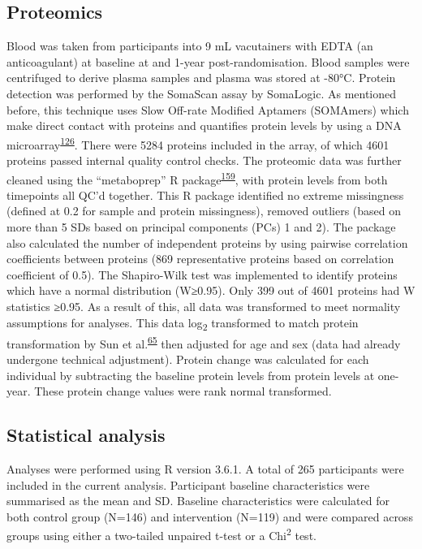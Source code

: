 \documentclass[11pt,twoside]{bristolthesis}
\begin{document}
\hypertarget{proteomics}{%
\subsection{Proteomics}\label{proteomics}}

Blood was taken from participants into 9 mL vacutainers with EDTA (an anticoagulant) at baseline at and 1-year post-randomisation. Blood samples were centrifuged to derive plasma samples and plasma was stored at -80°C. Protein detection was performed by the SomaScan assay by SomaLogic. As mentioned before, this technique uses Slow Off-rate Modified Aptamers (SOMAmers) which make direct contact with proteins and quantifies protein levels by using a DNA microarray\textsuperscript{\protect\hyperlink{ref-Rohloff2014}{126}}. There were 5284 proteins included in the array, of which 4601 proteins passed internal quality control checks. The proteomic data was further cleaned using the ``metaboprep'' R package\textsuperscript{\protect\hyperlink{ref-Hughes2021}{159}}, with protein levels from both timepoints all QC'd together. This R package identified no extreme missingness (defined at 0.2 for sample and protein missingness), removed outliers (based on more than 5 SDs based on principal components (PCs) 1 and 2). The package also calculated the number of independent proteins by using pairwise correlation coefficients between proteins (869 representative proteins based on correlation coefficient of 0.5). The Shapiro-Wilk test was implemented to identify proteins which have a normal distribution (W≥0.95). Only 399 out of 4601 proteins had W statistics ≥0.95. As a result of this, all data was transformed to meet normality assumptions for analyses. This data log\textsubscript{2} transformed to match protein transformation by Sun et al.\textsuperscript{\protect\hyperlink{ref-Sun2018}{65}} then adjusted for age and sex (data had already undergone technical adjustment). Protein change was calculated for each individual by subtracting the baseline protein levels from protein levels at one-year. These protein change values were rank normal transformed.

\hypertarget{statistical-analysis-1}{%
\subsection{Statistical analysis}\label{statistical-analysis-1}}

Analyses were performed using R version 3.6.1. A total of 265 participants were included in the current analysis. Participant baseline characteristics were summarised as the mean and SD. Baseline characteristics were calculated for both control group (N=146) and intervention (N=119) and were compared across groups using either a two-tailed unpaired t-test or a Chi\textsuperscript{2} test.
\end{document}
